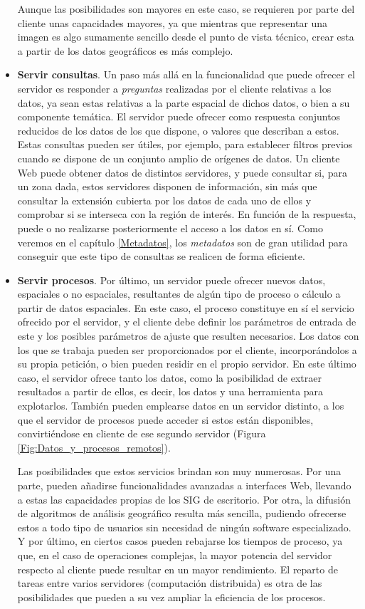 \begin{itemize}
Aunque las posibilidades son mayores en este caso, se requieren por parte del cliente unas capacidades mayores, ya que mientras que representar una imagen es algo sumamente sencillo desde el punto de vista técnico, crear esta a partir de los datos geográficos es más complejo.

\item \textbf{Servir consultas}. Un paso más allá en la funcionalidad que puede ofrecer el servidor es responder a \emph{preguntas} realizadas por el cliente relativas a los datos, ya sean estas relativas a la parte espacial de dichos datos, o bien a su componente temática. El servidor puede ofrecer como respuesta conjuntos reducidos de los datos de los que dispone, o valores que describan a estos. Estas consultas pueden ser útiles, por ejemplo, para establecer filtros previos cuando se dispone de un conjunto amplio de orígenes de datos. Un cliente Web puede obtener datos de distintos servidores, y puede consultar si, para un zona dada, estos servidores disponen de información, sin más que consultar la extensión cubierta por los datos de cada uno de ellos y comprobar si se interseca con la región de interés. En función de la respuesta, puede o no realizarse posteriormente el acceso a los datos en sí. Como veremos en el capítulo \ref{Metadatos}, los \emph{metadatos} son de gran utilidad para conseguir que este tipo de consultas se realicen de forma eficiente.

\item \textbf{Servir procesos}. Por último, un servidor puede ofrecer nuevos datos, espaciales o no espaciales, resultantes de algún tipo de proceso o cálculo a partir de datos espaciales. En este caso, el proceso constituye en sí el servicio ofrecido por el servidor, y el cliente debe definir los parámetros de entrada de este y los posibles parámetros de ajuste que resulten necesarios. Los datos con los que se trabaja pueden ser proporcionados por el cliente, incorporándolos a su propia petición, o bien pueden residir en el propio servidor. En este último caso, el servidor ofrece tanto los datos, como la posibilidad de extraer resultados a partir de ellos, es decir, los datos y una herramienta para explotarlos. También pueden emplearse datos en un servidor distinto, a los que el servidor de procesos puede acceder si estos están disponibles, convirtiéndose en cliente de ese segundo servidor (Figura \ref{Fig:Datos_y_procesos_remotos}).

Las posibilidades que estos servicios brindan son muy numerosas. Por una parte, pueden añadirse funcionalidades avanzadas a interfaces Web, llevando a estas las capacidades propias de los SIG de escritorio. Por otra, la difusión de algoritmos de análisis geográfico resulta más sencilla, pudiendo ofrecerse estos a todo tipo de usuarios sin necesidad de ningún software especializado. Y por último, en ciertos casos pueden rebajarse los tiempos de proceso, ya que, en el caso de operaciones complejas, la mayor potencia del servidor respecto al cliente puede resultar en un mayor rendimiento. El reparto de tareas entre varios servidores (computación distribuida) es otra de las posibilidades que pueden a su vez ampliar la eficiencia de los procesos.


\end{itemize}
